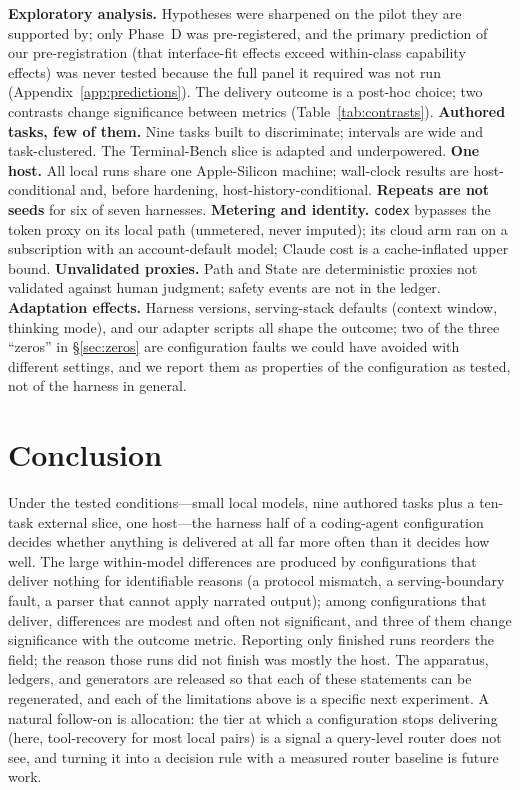\documentclass[10pt]{article}
\begin{document}
\textbf{Exploratory analysis.} Hypotheses were sharpened on the pilot they are supported by; only
Phase~D was pre-registered, and the primary prediction of our pre-registration (that interface-fit
effects exceed within-class capability effects) was never tested because the full panel it required
was not run (Appendix~\ref{app:predictions}). The delivery outcome is a post-hoc choice; two
contrasts change significance between metrics (Table~\ref{tab:contrasts}). \textbf{Authored tasks,
few of them.} Nine tasks built to discriminate; intervals are wide and task-clustered. The
Terminal-Bench slice is adapted and underpowered. \textbf{One host.} All local runs share one
Apple-Silicon machine; wall-clock results are host-conditional and, before hardening,
host-history-conditional. \textbf{Repeats are not seeds} for six of seven harnesses.
\textbf{Metering and identity.} \texttt{codex} bypasses the token proxy on its local path
(unmetered, never imputed); its cloud arm ran on a subscription with an account-default model;
Claude cost is a cache-inflated upper bound. \textbf{Unvalidated proxies.} Path and State are
deterministic proxies not validated against human judgment; safety events are not in the ledger.
\textbf{Adaptation effects.} Harness versions, serving-stack defaults (context window, thinking
mode), and our adapter scripts all shape the outcome; two of the three ``zeros'' in
\S\ref{sec:zeros} are configuration faults we could have avoided with different settings, and we
report them as properties of the configuration as tested, not of the harness in general.

\section{Conclusion}
\label{sec:conclusion}

Under the tested conditions---small local models, nine authored tasks plus a ten-task external
slice, one host---the harness half of a coding-agent configuration decides whether anything is
delivered at all far more often than it decides how well. The large within-model differences are
produced by configurations that deliver nothing for identifiable reasons (a protocol mismatch, a
serving-boundary fault, a parser that cannot apply narrated output); among configurations that
deliver, differences are modest and often not significant, and three of them change significance
with the outcome metric. Reporting only finished runs reorders the field; the reason those runs did
not finish was mostly the host. The apparatus, ledgers, and generators are released so that each of
these statements can be regenerated, and each of the limitations above is a specific next
experiment. A natural follow-on is allocation: the tier at which a configuration stops delivering
(here, tool-recovery for most local pairs) is a signal a query-level router does not see, and
turning it into a decision rule with a measured router baseline is future work.
\end{document}
